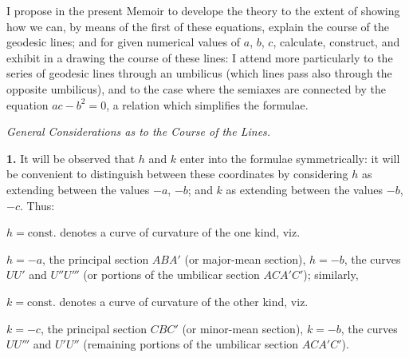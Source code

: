 \documentclass[11pt]{article}
\begin{document}
I propose in the present Memoir to develope the theory to the extent of showing
how we can, by means of the first of these equations, explain the course of the
geodesic lines; and for given numerical values of $a$, $b$, $c$, calculate,
construct, and exhibit in a drawing the course of these lines: I attend more
particularly to the series of geodesic lines through an umbilicus (which lines
pass also through the opposite umbilicus), and to the case where the semiaxes
are connected by the equation $ac-b^{2}=0$, a relation which simplifies the
formulae.

\medskip

\begin{center}\textit{General Considerations as to the Course of the Lines.}\end{center}

\medskip

\textbf{1.} It will be observed that $h$ and $k$ enter into the formulae
symmetrically: it will be convenient to distinguish between these coordinates
by considering $h$ as extending between the values $-a$, $-b$; and $k$ as
extending between the values $-b$, $-c$. Thus:

$h=\mathrm{const.}$ denotes a curve of curvature of the one kind, viz.

$h=-a$, the principal section $ABA'$ (or major-mean section), $h=-b$, the
curves $UU'$ and $U''U'''$ (or portions of the umbilicar section $ACA'C'$);
similarly,

$k=\mathrm{const.}$ denotes a curve of curvature of the other kind, viz.

$k=-c$, the principal section $CBC'$ (or minor-mean section), $k=-b$, the
curves $UU'''$ and $U'U''$ (remaining portions of the umbilicar section
$ACA'C'$).

\medskip

\begin{center}
\end{center}
\end{document}

